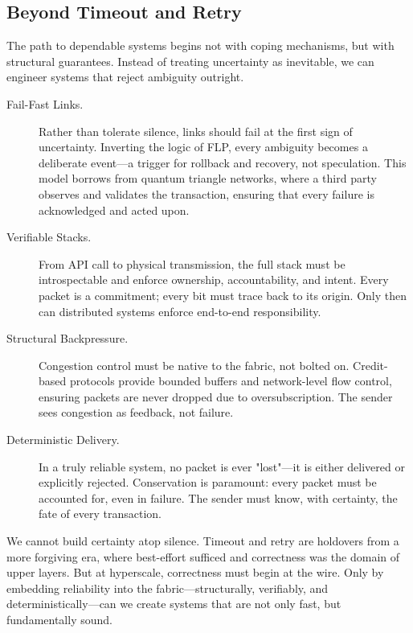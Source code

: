 \documentclass[../OAE-SPEC-MAIN.tex]{subfiles}
\begin{document}
\subsection*{Beyond Timeout and Retry}

The path to dependable systems begins not with coping mechanisms, but with structural guarantees. Instead of treating uncertainty as inevitable, we can engineer systems that reject ambiguity outright.

\begin{description}

  \item[Fail-Fast Links.]  
  Rather than tolerate silence, links should fail at the first sign of uncertainty. Inverting the logic of FLP, every ambiguity becomes a deliberate event—a trigger for rollback and recovery, not speculation. This model borrows from quantum triangle networks, where a third party observes and validates the transaction, ensuring that every failure is acknowledged and acted upon.

  \item[Verifiable Stacks.]  
  From API call to physical transmission, the full stack must be introspectable and enforce ownership, accountability, and intent. Every packet is a commitment; every bit must trace back to its origin. Only then can distributed systems enforce end-to-end responsibility.

  \item[Structural Backpressure.]  
  Congestion control must be native to the fabric, not bolted on. Credit-based protocols provide bounded buffers and network-level flow control, ensuring packets are never dropped due to oversubscription. The sender sees congestion as feedback, not failure.

  \item[Deterministic Delivery.]  
  In a truly reliable system, no packet is ever "lost"—it is either delivered or explicitly rejected. Conservation is paramount: every packet must be accounted for, even in failure. The sender must know, with certainty, the fate of every transaction.

\end{description}

We cannot build certainty atop silence. Timeout and retry are holdovers from a more forgiving era, where best-effort sufficed and correctness was the domain of upper layers. But at hyperscale, correctness must begin at the wire. Only by embedding reliability into the fabric—structurally, verifiably, and deterministically—can we create systems that are not only fast, but fundamentally sound.
\end{document}
